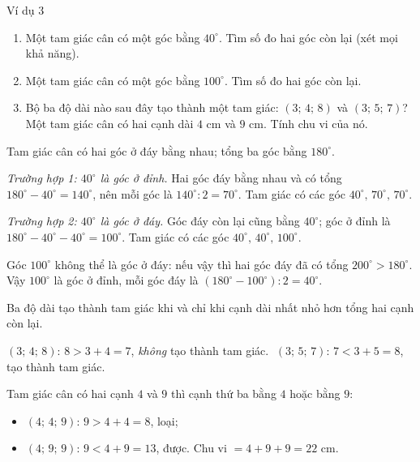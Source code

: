\begin{exbox}{Ví dụ 3}
\begin{enumerate}[label=\alph*),leftmargin=1.6em,itemsep=0pt,topsep=2pt]
  \item Một tam giác cân có một góc bằng $40^\circ$. Tìm số đo hai góc còn lại (xét mọi khả năng).
  \item Một tam giác cân có một góc bằng $100^\circ$. Tìm số đo hai góc còn lại.
  \item Bộ ba độ dài nào sau đây tạo thành một tam giác: $(3;\,4;\,8)$ và $(3;\,5;\,7)$? Một tam giác cân có hai cạnh dài $4$ cm và $9$ cm. Tính chu vi của nó.
\end{enumerate}
\guide
{}
\begin{recallbox}Tam giác cân có hai góc ở đáy bằng nhau; tổng ba góc bằng $180^\circ$.\end{recallbox}
\emph{Trường hợp 1: $40^\circ$ là góc ở đỉnh.} Hai góc đáy bằng nhau và có tổng $180^\circ-40^\circ=140^\circ$, nên mỗi góc là $140^\circ:2=70^\circ$. Tam giác có các góc $40^\circ,\,70^\circ,\,70^\circ$.

\emph{Trường hợp 2: $40^\circ$ là góc ở đáy.} Góc đáy còn lại cũng bằng $40^\circ$; góc ở đỉnh là $180^\circ-40^\circ-40^\circ=100^\circ$. Tam giác có các góc $40^\circ,\,40^\circ,\,100^\circ$.

Góc $100^\circ$ không thể là góc ở đáy: nếu vậy thì hai góc đáy đã có tổng $200^\circ>180^\circ$. Vậy $100^\circ$ là góc ở đỉnh, mỗi góc đáy là $(180^\circ-100^\circ):2=40^\circ$.

\begin{recallbox}Ba độ dài tạo thành tam giác khi và chỉ khi cạnh dài nhất nhỏ hơn tổng hai cạnh còn lại.\end{recallbox}
$(3;\,4;\,8)$: $8>3+4=7$, \emph{không} tạo thành tam giác. $\;(3;\,5;\,7)$: $7<3+5=8$, tạo thành tam giác.

Tam giác cân có hai cạnh $4$ và $9$ thì cạnh thứ ba bằng $4$ hoặc bằng $9$:
\begin{itemize}[leftmargin=1.3em,itemsep=0pt,topsep=0pt]
  \item $(4;\,4;\,9)$: $9>4+4=8$, loại;
  \item $(4;\,9;\,9)$: $9<4+9=13$, được. Chu vi $=4+9+9=22$ cm.
\end{itemize}
\end{exbox}

